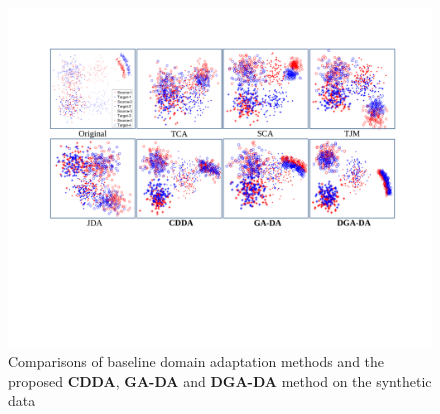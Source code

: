 \documentclass[journal,twocolumn]{IEEEtran}
\begin{document}
\begin{CJK*}{UTF8}{gkai}
\begin{figure}[h!]
	\centering
	\includegraphics[width=1\linewidth]{compare.pdf}
	\caption {Comparisons of baseline domain adaptation methods and the proposed \textbf{CDDA}, \textbf{GA-DA} and \textbf{DGA-DA} method on the synthetic data} 
    	\label{fig:compare}
\end{figure} 






\end{CJK*}
\end{document}
